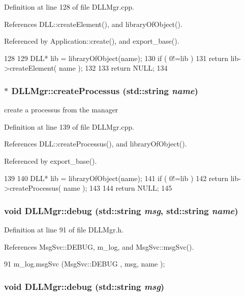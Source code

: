 Definition at line 128 of file DLLMgr.cpp.

References DLL::createElement(), and libraryOfObject().

Referenced by Application::create(), and export\_\-base().


\begin{DoxyCode}
128                                                 {
129   DLL* lib = libraryOfObject(name);
130   if ( 0!=lib ){
131     return lib->createElement( name );
132   }
133   return NULL;
134 }
\end{DoxyCode}
\hypertarget{classDLLMgr_a04161fedb24bb6ae8469848d97804c39}{
\subsubsection[{createProcessus}]{ $\ast$ DLLMgr::createProcessus (std::string {\em name})}}
\label{classDLLMgr_a04161fedb24bb6ae8469848d97804c39}
create a processus from the manager 

Definition at line 139 of file DLLMgr.cpp.

References DLL::createProcessus(), and libraryOfObject().

Referenced by export\_\-base().


\begin{DoxyCode}
139                                                     {
140   DLL* lib = libraryOfObject(name);
141   if ( 0!=lib ){
142     return lib->createProcessus( name );
143   }
144   return NULL;
145 }
\end{DoxyCode}
\hypertarget{classDLLMgr_aef993dc0eea2972286957dda940ccdf2}{
\subsubsection[{debug}]{\setlength{\rightskip}{0pt plus 5cm}void DLLMgr::debug (std::string {\em msg}, \/  std::string {\em name})}}
\label{classDLLMgr_aef993dc0eea2972286957dda940ccdf2}


Definition at line 91 of file DLLMgr.h.

References MsgSvc::DEBUG, m\_\-log, and MsgSvc::msgSvc().


\begin{DoxyCode}
91 { m_log.msgSvc (MsgSvc::DEBUG   , msg, name ); }
\end{DoxyCode}
\hypertarget{classDLLMgr_ad5f2427768e6cfe25c255e7899e4203f}{
\subsubsection[{debug}]{\setlength{\rightskip}{0pt plus 5cm}void DLLMgr::debug (std::string {\em msg})}}
\label{classDLLMgr_ad5f2427768e6cfe25c255e7899e4203f}


